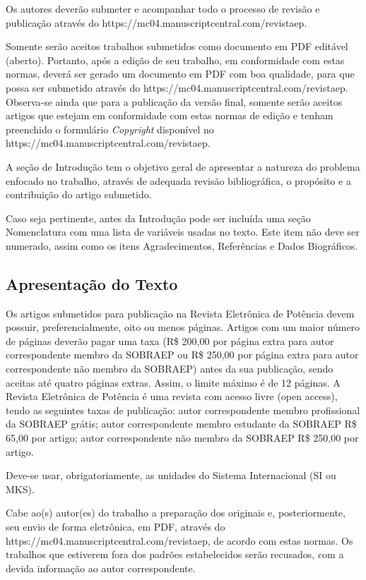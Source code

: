 \documentclass[portugues]{sobraep}
\begin{document}
Os autores deverão submeter e acompanhar todo o processo de revisão e publicação através do https://mc04.manuscriptcentral.com/revistaep.

Somente serão aceitos trabalhos submetidos como documento em PDF editável (aberto). Portanto, após a edição de seu trabalho, em conformidade com estas normas, deverá ser gerado um documento em PDF com boa qualidade, para que possa ser submetido através do https://mc04.manuscriptcentral.com/revistaep. Observa-se ainda que para a publicação da versão final, somente serão aceitos artigos que estejam em conformidade com estas normas de edição e tenham preenchido o formulário \textit{Copyright} disponível no https://mc04.manuscriptcentral.com/revistaep.

A seção de Introdução tem o objetivo geral de apresentar a natureza do problema enfocado no trabalho, através de adequada revisão bibliográfica, o propósito e a contribuição do artigo submetido.

Caso seja pertinente, antes da Introdução pode ser incluída uma seção Nomenclatura com uma lista de variáveis usadas no texto. Este item não deve ser numerado, assim como os itens Agradecimentos, Referências e Dados Biográficos.

\subsection{Apresentação do Texto}

Os artigos submetidos para publicação na Revista Eletrônica de Potência devem possuir, preferencialmente, oito ou menos páginas. Artigos com um maior número de páginas deverão pagar uma taxa (R\$ 200,00 por página extra para autor correspondente membro da SOBRAEP ou R\$ 250,00 por página extra para autor correspondente não membro da SOBRAEP) antes da sua publicação, sendo aceitas até quatro páginas extras. Assim, o limite máximo é de 12 páginas.
A Revista Eletrônica de Potência é uma revista com acesso livre (open access), tendo as seguintes taxas de publicação: autor correspondente membro profissional da SOBRAEP grátis; autor correspondente membro estudante da SOBRAEP R\$ 65,00 por artigo; autor correspondente não membro da SOBRAEP R\$ 250,00 por artigo.

Deve-se usar, obrigatoriamente, as unidades do Sistema Internacional (SI ou MKS).

Cabe ao(s) autor(es) do trabalho a preparação dos originais e, posteriormente, seu envio de forma eletrônica, em PDF, através do https://mc04.manuscriptcentral.com/revistaep, de acordo com estas normas. Os trabalhos que estiverem fora dos padrões estabelecidos serão recusados, com a devida informação ao autor correspondente.
\end{document}

